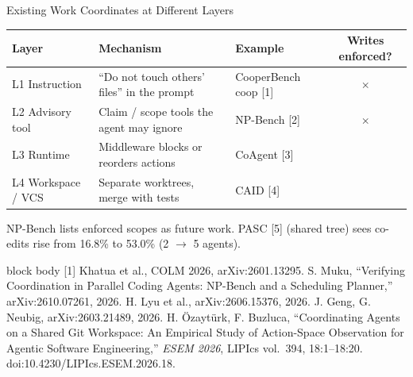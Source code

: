 \documentclass[aspectratio=169,11pt]{beamer}
\newcommand{\papercite}[1]{%
  \vfill
  \begin{beamercolorbox}[wd=\textwidth,sep=3pt]{block body}
    \tiny #1
  \end{beamercolorbox}}
\newcommand{\yes}{\textcolor{green!50!black}{\checkmark}}
\newcommand{\no}{\textcolor{red!70!black}{$\times$}}
\begin{document}
\begin{frame}{Existing Work Coordinates at Different Layers}
  \small
  \begin{tabularx}{\textwidth}{l X l c}
    \toprule
    Layer & Mechanism & Example & Writes enforced? \\
    \midrule
    L1 Instruction & ``Do not touch others' files'' in the prompt & CooperBench coop [1] & \no \\
    L2 Advisory tool & Claim / scope tools the agent may ignore & NP-Bench [2] & \no \\
    L3 Runtime & Middleware blocks or reorders actions & CoAgent [3] & \yes \\
    L4 Workspace / VCS & Separate worktrees, merge with tests & CAID [4] & \yes \\
    \bottomrule
  \end{tabularx}
  \vspace{0.6em}

  \footnotesize NP-Bench lists enforced scopes as future work. PASC [5] (shared tree) sees co-edits rise from 16.8\% to 53.0\% (2 $\to$ 5 agents).
  \papercite{[1] Khatua et al., COLM 2026, arXiv:2601.13295. \;
  [2] S. Muku, ``Verifying Coordination in Parallel Coding Agents: NP-Bench and a Scheduling Planner,'' arXiv:2610.07261, 2026. \;
  [3] H. Lyu et al., arXiv:2606.15376, 2026. \;
  [4] J. Geng, G. Neubig, arXiv:2603.21489, 2026. \;
  [5] H. \"Ozayt\"urk, F. Buzluca, ``Coordinating Agents on a Shared Git Workspace: An Empirical Study of Action-Space Observation for Agentic Software Engineering,'' \textit{ESEM 2026}, LIPIcs vol.~394, 18:1--18:20. doi:10.4230/LIPIcs.ESEM.2026.18.}
\end{frame}

\end{document}
